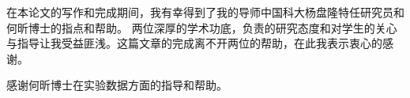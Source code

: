 
\begin{acknowledgements}

%

在本论文的写作和完成期间，我有幸得到了我的导师中国科大杨盘隆特任研究员和何昕博士的指点和帮助。
两位深厚的学术功底，负责的研究态度和对学生的关心与指导让我受益匪浅。这篇文章的完成离不开两位的帮助，在此我表示衷心的感谢。

感谢何昕博士在实验数据方面的指导和帮助。

\end{acknowledgements}
